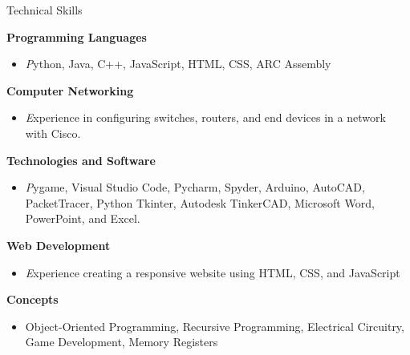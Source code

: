 \documentclass[
	10pt, %
]{resume} %
\begin{document}

\begin{rSection}{Technical Skills}

    \textbf{Programming Languages}
        \begin{itemize}
            \item \textit Python, Java, C++, JavaScript, HTML, CSS, ARC Assembly
        \end{itemize}
        
    \textbf{Computer Networking}
        \begin{itemize}
            \item \textit Experience in configuring switches, routers, and end devices in a network with Cisco.
        \end{itemize}

    \textbf{Technologies and Software}
        \begin{itemize}
            \item \textit Pygame, Visual Studio Code, Pycharm, Spyder, Arduino, AutoCAD, PacketTracer, Python Tkinter, Autodesk TinkerCAD, Microsoft Word, PowerPoint, and Excel.
        \end{itemize}

    \textbf{Web Development}
        \begin{itemize}
            \item \textit Experience creating a responsive website using HTML, CSS, and JavaScript
        \end{itemize}

    \textbf{Concepts}
    \begin{itemize}
        \item Object-Oriented Programming, Recursive Programming, Electrical Circuitry, Game Development, Memory Registers
    \end{itemize}

\end{rSection}

\end{document}
